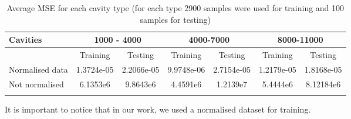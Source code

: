 \documentclass{article}
\begin{document}
	\begin{table}[]
		\caption{Average MSE for each cavity type (for each type 2900 samples were used for training and 100 samples for testing)}
		\begin{tabular}{lcccccc}
			\toprule
			Cavities & \multicolumn{2}{c}{1000 - 4000} & \multicolumn{2}{c}{4000-7000} & \multicolumn{2}{c}{8000-11000} \\
			\midrule
			& Training & Testing & Training & Testing & Training & Testing \\
			\midrule
			Normalised data & 1.3724e-05 & 2.2066e-05 & 9.9748e-06 & 2.7154e-05 & 1.2179e-05 & 1.8168e-05 \\
			Not normalised & 6.1353e6 & 9.8643e6 & 4.4591e6 & 1.2139e7 & 5.4444e6 & 8.12184e6 \\
			\bottomrule
			&  &  &  &  &  & 
		\end{tabular}

	\end{table}
	It is important to notice that in our work, we used a normalised dataset for training.
\end{document}
